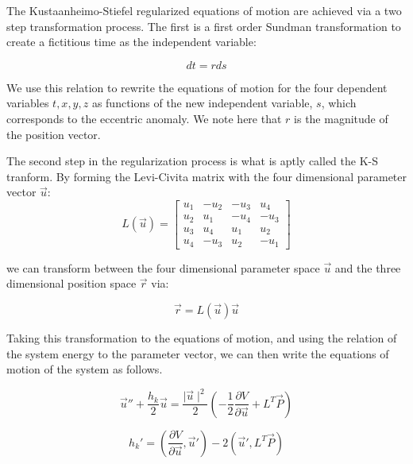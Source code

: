 \documentclass[11pt,twoside,letterpaper]{article}
\begin{document}
  The Kustaanheimo-Stiefel regularized equations of motion are
  achieved via a two step transformation process. The first is a first
  order Sundman transformation to create a fictitious time as the
  independent variable:

  \begin{equation}
    dt = rds
  \end{equation}

  We use this relation to rewrite the equations of motion for the four
  dependent variables \(t, x, y, z\) as functions of the new
  independent variable, \(s\), which corresponds to the eccentric
  anomaly. We note here that \(r\) is the magnitude of the position
  vector.
 
  The second step in the regularization process is what is aptly
  called the K-S tranform. By forming the Levi-Civita matrix with the
  four dimensional parameter vector \(\vec{u}\):
  \begin{equation} \label{levi}
    L(\vec{u}) =
    \begin{bmatrix}
      u_1 & -u_2& -u_3& u_4 \\
      u_2 & u_1 & -u_4& -u_3 \\
      u_3 & u_4 & u_1 & u_2 \\
      u_4 & -u_3& u_2 & -u_1
    \end{bmatrix}
  \end{equation}

  we can transform between the four dimensional parameter space
  \(\vec{u}\) and the three dimensional position space \(\vec{r}\)
  via:

  \begin{equation} \label{xtrans}
    \vec{r} = L(\vec{u})\vec{u}
  \end{equation}

  Taking this transformation to the equations of motion, and using the
  relation of the system energy to the parameter vector, we can then
  write the equations of motion of the system as follows.

  \begin{equation} \label{eom}
    \vec{u}'' + \frac{h_k}{2}\vec{u} = \frac{\mid\vec{u}\mid^2}{2}
    \left(-\frac{1}{2}\frac{\partial{V}}{\partial{\vec{u}}} + L^T\vec{P}\right)
  \end{equation}

  \begin{equation} \label{energy_eom}
    h_k' = \left(\frac{\partial{V}}{\partial{\vec{u}}}, \vec{u}'\right)
    - 2\left(\vec{u}',L^T\vec{P}\right)
  \end{equation}
\end{document}
